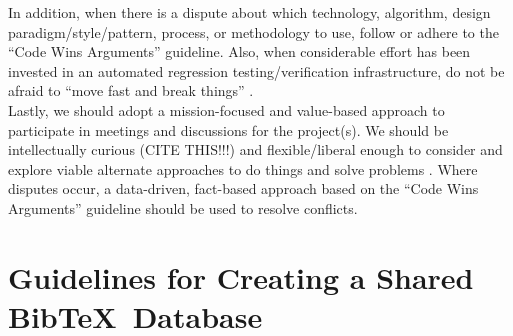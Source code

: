 \documentclass[letter,12pt]{article}
\begin{document}

In addition, when there is a dispute about which technology, algorithm, design paradigm/style/pattern, process, or methodology to use, follow or adhere to the ``Code Wins Arguments'' \cite{Kushner2011,Zuckerberg2012} guideline. Also, when considerable effort has been invested in an automated regression testing/verification infrastructure, do not be afraid to ``move fast and break things'' \cite{Fong2011,Evangelista2012}. \\

Lastly, we should adopt a mission-focused and value-based approach to participate in meetings and discussions for the project(s). We should be intellectually curious {\Huge (CITE THIS!!!)} and flexible/liberal enough to consider and explore viable alternate approaches to do things and solve problems \cite{Beedle2001,Beedle2001a}. Where disputes occur, a data-driven, fact-based approach based on the ``Code Wins Arguments'' guideline should be used to resolve conflicts.

\section{Guidelines for Creating a Shared {\sc Bib}\TeX\ Database}
\label{sec:GuidelinesforCreatingaSharedBibTeXDatabase}
\end{document}

